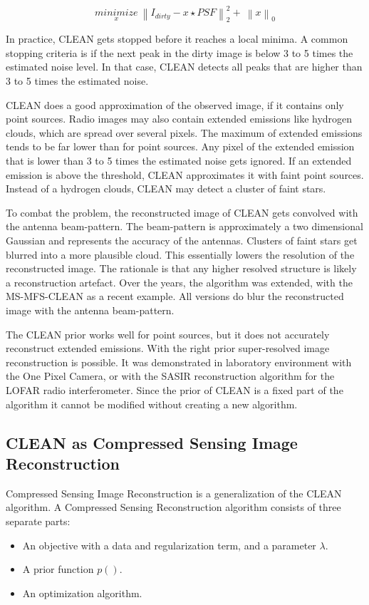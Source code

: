 \begin{equation}\label{intro:eq:clean}
\underset{x}{minimize} \: \left \| I_{dirty} - x \star PSF \right \|_2^2 + \: \left \| x \right \|_0
\end{equation}

In practice, CLEAN gets stopped before it reaches a local minima. A common stopping criteria is if the next peak in the dirty image is below 3 to 5 times the estimated noise level. In that case, CLEAN detects all peaks that are higher than 3 to 5 times the estimated noise. 

CLEAN does a good approximation of the observed image, if it contains only point sources. Radio images may also contain extended emissions like hydrogen clouds, which are spread over several pixels. The maximum of extended emissions tends to be far lower than for point sources. Any pixel of the extended emission that is lower than 3 to 5 times the estimated noise gets ignored. If an extended emission is above the threshold, CLEAN approximates it with faint point sources. Instead of a hydrogen clouds, CLEAN may detect a cluster of faint stars.

To combat the problem, the reconstructed image of CLEAN gets convolved with the antenna beam-pattern. The beam-pattern is approximately a two dimensional Gaussian and represents the accuracy of the antennas. Clusters of faint stars get blurred into a more plausible cloud. This essentially lowers the resolution of the reconstructed image. The rationale is that any higher resolved structure is likely a reconstruction artefact. Over the years, the algorithm was extended, with the MS-MFS-CLEAN\cite{rau2011multi} as a recent example. All versions do blur the reconstructed image with the antenna beam-pattern.

The CLEAN prior works well for point sources, but it does not accurately reconstruct extended emissions. With the right prior super-resolved image reconstruction is possible. It was demonstrated in laboratory environment with the One Pixel Camera\cite{singlePixel}, or with the SASIR\cite{girard2015sparse} reconstruction algorithm for the LOFAR radio interferometer. Since the prior of CLEAN is a fixed part of the algorithm it cannot be modified without creating a new algorithm.


\subsection{CLEAN as Compressed Sensing Image Reconstruction}
Compressed Sensing Image Reconstruction is a generalization of the CLEAN algorithm. A Compressed Sensing Reconstruction algorithm consists of three separate parts:
\begin{itemize}
	\item An objective with a data and regularization term, and a parameter $\lambda$.
	\item A prior function $p()$.
	\item An optimization algorithm.
\end{itemize}

